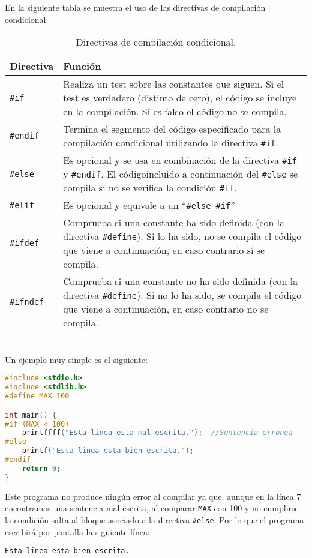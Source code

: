 En la siguiente tabla se muestra el uso de las directivas de compilación condicional:
\begin{table}[htbp]
	\begin{center}
		\begin{tabular}{|p{2cm} | p{14cm}|}
			\hline 
			\textbf{Directiva} & \textbf{Función}  \\
			\hline
			\texttt{\#if} & Realiza un test sobre las constantes que siguen. Si el test es verdadero (distinto de cero), el código se incluye en la compilación. Si es falso el código no se compila.\\ \hline
			\texttt{\#endif} & Termina el segmento del código especificado para la compilación condicional utilizando la directiva \texttt{\#if}.\\ \hline
			\texttt{\#else} & Es opcional y se usa en combinación de la directiva \texttt{\#if} y \texttt{\#endif}. El códigoincluido a continuación del \texttt{\#else} se compila si no se verifica la condición \texttt{\#if}.\\ \hline
			\texttt{\#elif} & Es opcional y equivale a un ``\texttt{\#else \#if}''\\ \hline
			\texttt{\#ifdef} & Comprueba si una constante ha sido definida (con la directiva \texttt{\#define}). Si lo ha sido, no se compila el código que viene a continuación, en caso contrario sí se compila.\\ \hline
			\texttt{\#ifndef} & Comprueba si una constante no ha sido definida (con la directiva \texttt{\#define}). Si no lo ha sido, se compila el código que viene a continuación, en caso contrario no se compila.\\ \hline	
		\end{tabular}
		\caption{Directivas de compilación condicional.}
		\label{tabla:Directivas de compilación condicional}
	\end{center}
\end{table}
\\Un ejemplo muy simple es el siguiente:
\begin{Ejemplo}
\begin{lstlisting}[language=C]
#include <stdio.h>
#include <stdlib.h>
#define MAX 100

int main() {
#if (MAX < 100)
    printffff("Esta linea esta mal escrita.");	//Sentencia erronea
#else
    printf("Esta linea esta bien escrita.");
#endif
    return 0;
}
\end{lstlisting}
\Explicacion
Este programa no produce ningún error al compilar ya que, aunque en la línea 7 encontramos una sentencia mal escrita, al comparar \texttt{MAX} con 100 y no cumplirse la condición salta al bloque asociado a la directiva \texttt{\#else}. Por lo que el programa escribirá por pantalla la siguiente línea:

\texttt{Esta linea esta bien escrita.}
\end{Ejemplo}